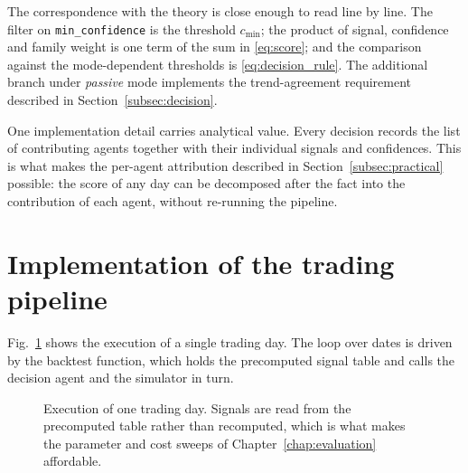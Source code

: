 The correspondence with the theory is close enough to read line by line. The filter on \texttt{min\_confidence} is the threshold $c_{\min}$; the product of signal, confidence and family weight is one term of the sum in \eqref{eq:score}; and the comparison against the mode-dependent thresholds is \eqref{eq:decision_rule}. The additional branch under \emph{passive} mode implements the trend-agreement requirement described in Section~\ref{subsec:decision}.

One implementation detail carries analytical value. Every decision records the list of contributing agents together with their individual signals and confidences. This is what makes the per-agent attribution described in Section~\ref{subsec:practical} possible: the score of any day can be decomposed after the fact into the contribution of each agent, without re-running the pipeline.

\section{Implementation of the trading pipeline}\label{sec:pipeline}

Fig.~\ref{fig:sequence_diagram} shows the execution of a single trading day. The loop over dates is driven by the backtest function, which holds the precomputed signal table and calls the decision agent and the simulator in turn.

\begin{figure}[!htbp]
\centering
{}
\caption{Execution of one trading day. Signals are read from the precomputed table rather than recomputed, which is what makes the parameter and cost sweeps of Chapter~\ref{chap:evaluation} affordable.}
\label{fig:sequence_diagram}
\end{figure}


